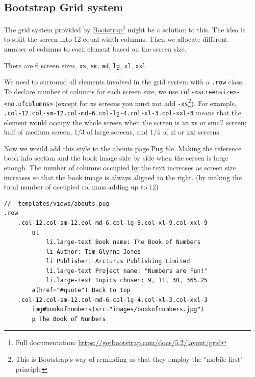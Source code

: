 \subsection{Bootstrap Grid system}
\label{sec:grid}



The grid system provided by \href{https://getbootstrap.com/docs/5.2/layout/grid}{Bootstrap}\footnote{Full documentation: \url{https://getbootstrap.com/docs/5.2/layout/grid}} might be a solution to this. The idea is to split the screen into 12 equal width columns. Then we allocate different number of columns to each element based on the screen size.

There are 6 screen sizes, \texttt{xs}, \texttt{sm}, \texttt{md}, \texttt{lg}, \texttt{xl}, \texttt{xxl}.

We need to surround all elements involved in the grid system with a \texttt{.row} class. To declare number of columns for each screen size, we use \texttt{col-<screensize>-\hfill \break <no.ofcolumns>} (except for xs screens you must not add \texttt{-xs}\footnote{This is Bootstrap's way of reminding us that they employ the "mobile first" principle}). For example, \texttt{.col-12.col-sm-12.col-md-6.col-lg-4.col-xl-3.col-xxl-3} means that the element would occupy the whole screen when the screen is an xs or small screen; half of medium screen, 1/3 of large screens, and 1/4 of xl or xxl screens. 

Now we would add this style to the abouts page Pug file. Making the reference book info section and the book image side by side when the screen is large enough. The number of columns occupied by the text increases as screen size increases so that the book image is always aligned to the right. (by making the total number of occupied columns adding up to 12)
\vspace{6mm}

\begin{lstlisting}[language=pug]
//- templates/views/abouts.pug
.row
	.col-12.col-sm-12.col-md-6.col-lg-8.col-xl-9.col-xxl-9
		ul
			li.large-text Book name: The Book of Numbers
			li Author: Tim Glynne-Jones
			li Publisher: Arcturus Publishing Limited
			li.large-text Project name: "Numbers are Fun!"
			li.large-text Topics chosen: 9, 11, 30, 365.25
		a(href="#quote") Back to top
	.col-12.col-sm-12.col-md-6.col-lg-4.col-xl-3.col-xxl-3
		img#bookofnumbers(src="images/bookofnumbers.jpg")
		p The Book of Numbers
\end{lstlisting}

